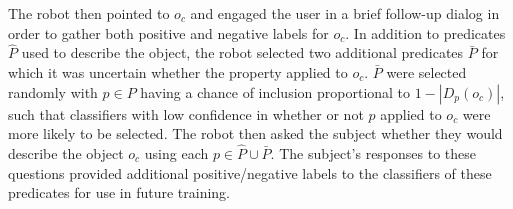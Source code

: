 The robot then pointed to $o_c$ and engaged the user in a brief follow-up
dialog in order to gather both positive and negative labels for $o_c$.  In
addition to predicates $\hat{P}$ used to describe the object, the robot
selected two additional predicates $\bar{P}$ for which it was uncertain whether
the property applied to $o_c$.  $\bar{P}$ were selected randomly with $p\in P$
having a chance of inclusion proportional to $1-|D_p(o_c)|$, such that
classifiers with low confidence in whether or not $p$ applied to $o_c$ were
more likely to be selected.  The robot then asked the subject whether they
would describe the object $o_c$ using each $p\in\hat{P}\cup\bar{P}$.  The
subject's responses to these questions provided additional positive/negative
labels to the classifiers of these predicates for use in future training.
